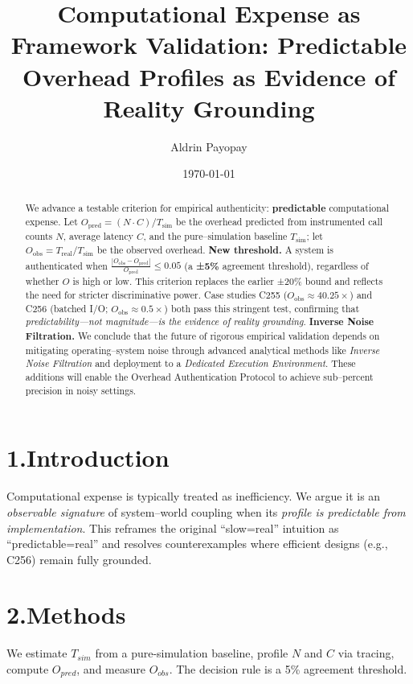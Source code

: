 \documentclass[11pt]{article}
\title{Computational Expense as Framework Validation: Predictable Overhead Profiles as Evidence of Reality Grounding}
\author{Aldrin Payopay}
\date{\today}
\begin{document}
\maketitle

\begin{abstract}
We advance a testable criterion for empirical authenticity: \textbf{predictable} computational expense. 
Let $O_{\text{pred}}=(N\cdot C)/T_{\text{sim}}$ be the overhead predicted from instrumented call counts $N$, average latency $C$, and the pure--simulation baseline $T_{\text{sim}}$; let $O_{\text{obs}}=T_{\text{real}}/T_{\text{sim}}$ be the observed overhead. 
\textbf{New threshold.}  A system is authenticated when \(\frac{|O_{\text{obs}}-O_{\text{pred}}|}{O_{\text{pred}}}\le 0.05\) (a \textbf{±5\%} agreement threshold), regardless of whether $O$ is high or low.  This criterion replaces the earlier ±20\% bound and reflects the need for stricter discriminative power.
Case studies C255 ($O_{\text{obs}} \approx 40.25\times$) and C256 (batched I/O; $O_{\text{obs}} \approx 0.5\times$) both pass this stringent test, confirming that \emph{predictability—not magnitude—is the evidence of reality grounding}. 
\textbf{Inverse Noise Filtration.}  We conclude that the future of rigorous empirical validation depends on mitigating operating--system noise through advanced analytical methods like \emph{Inverse Noise Filtration} and deployment to a \emph{Dedicated Execution Environment}.  These additions will enable the Overhead Authentication Protocol to achieve sub--percent precision in noisy settings.
\end{abstract}

\section*{1.\quad Introduction}
Computational expense is typically treated as inefficiency. We argue it is an \emph{observable signature} of system--world coupling when its \emph{profile is predictable from implementation}. This reframes the original ``slow=real'' intuition as ``predictable=real'' and resolves counterexamples where efficient designs (e.g., C256) remain fully grounded.

\section*{2.\quad Methods}
We estimate $T_{sim}$ from a pure-simulation baseline, profile $N$ and $C$ via tracing, compute $O_{pred}$, and measure $O_{obs}$. The decision rule is a 5\% agreement threshold.
\end{document}
